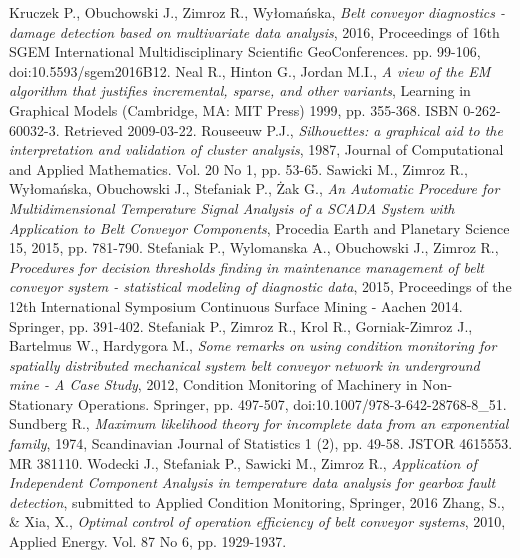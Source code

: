 \begin{thebibliography}{}
 Kruczek P., Obuchowski J., Zimroz R.,  Wy{\l}oma{\'n}ska, \emph{Belt conveyor diagnostics - damage detection based on multivariate data analysis}, 2016, Proceedings of 16th SGEM International Multidisciplinary Scientific GeoConferences. pp. 99-106, doi:10.5593/sgem2016B12.
 Neal R., Hinton G.,  Jordan M.I., \emph{A view of the EM algorithm that justifies incremental, sparse, and other variants}, Learning in Graphical Models (Cambridge, MA: MIT Press) 1999, pp. 355-368. ISBN 0-262-60032-3. Retrieved 2009-03-22.
 Rouseeuw  P.J., \emph{Silhouettes: a graphical aid to the interpretation and validation of cluster analysis}, 1987,  Journal of Computational and Applied Mathematics. Vol. 20 No 1, pp. 53-65.
 Sawicki M., Zimroz R., Wy{\l}oma{\'n}ska, Obuchowski J., Stefaniak P., {\.Z}ak G.,  \emph{An Automatic Procedure for Multidimensional Temperature Signal Analysis of a SCADA System with Application to Belt Conveyor Components}, Procedia Earth and Planetary Science 15, 2015, pp. 781-790.
 Stefaniak  P.,  Wylomanska  A.,  Obuchowski  J.,  Zimroz  R., \emph{Procedures  for  decision  thresholds  finding  in  maintenance management  of  belt  conveyor  system  -  statistical  modeling  of  diagnostic  data}, 2015, Proceedings of the 12th International Symposium Continuous Surface Mining - Aachen 2014. Springer, pp. 391-402.
 Stefaniak P., Zimroz R., Krol R., Gorniak-Zimroz J., Bartelmus W., Hardygora M., \emph{Some remarks on using condition monitoring for spatially distributed mechanical system belt conveyor network in underground mine - A Case Study}, 2012, Condition Monitoring of Machinery in Non-Stationary Operations. Springer, pp. 497-507, doi:10.1007/978-3-642-28768-8\_51.
 Sundberg R., \emph{Maximum likelihood theory for incomplete data from an exponential family}, 1974, Scandinavian Journal of Statistics 1 (2), pp. 49-58. JSTOR 4615553. MR 381110.
 Wodecki J., Stefaniak P., Sawicki M., Zimroz R., \emph{Application of Independent Component Analysis in temperature data analysis for gearbox fault detection}, submitted to Applied Condition Monitoring, Springer, 2016
 Zhang, S., \& Xia, X., \emph{Optimal control of operation efficiency of belt conveyor systems}, 2010, Applied Energy. Vol. 87 No 6, pp. 1929-1937.
\end{thebibliography}

